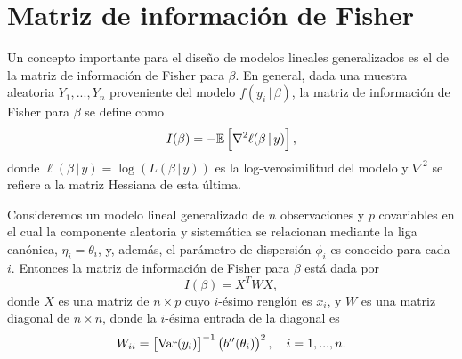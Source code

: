 \section{Matriz de información de Fisher}

Un concepto importante para el diseño de modelos lineales generalizados es el de la matriz de información de Fisher para $\beta$. En general, dada una muestra aleatoria $Y_1, ..., Y_n$ proveniente del modelo $f(y_i \, | \, \beta)$, la matriz de información de Fisher para $\beta$ se define como
\begin{equation} \label{eq:fisher_info_matrix_general}
	I(\beta) = -\mathbb{E} \left[ \nabla^2 \ell(\beta \, | \, y) \right],
\end{equation}
donde $\ell(\beta \, | \, y) = \log( L( \beta \, | \, y ) )$ es la log-verosimilitud del modelo y $\nabla^2$ se refiere a la matriz Hessiana de esta última. 

\begin{proposition}
	Consideremos un modelo lineal generalizado de $n$ observaciones y $p$ covariables en el cual la componente aleatoria y sistemática se relacionan mediante la liga canónica, $\eta_i = \theta_i$, y, además, el parámetro de dispersión $\phi_i$ es conocido para cada $i$. Entonces la matriz de información de Fisher para $\beta$ está dada por
    \begin{equation} \label{eq:fisher_info_matrix}
    	I(\beta) = X^T W X,
    \end{equation}
    donde $X$ es una matriz de $n \times p$ cuyo $i$-ésimo renglón es $x_i$, y $W$ es una matriz diagonal de $n \times n$, donde la $i$-ésima entrada de la diagonal es
\begin{equation*}
	W_{ii} = \left[ \mathrm{Var} (y_i) \right]^{-1} \left( b''(\theta_i) \right)^2, \quad i=1,...,n.
	\end{equation*}
\end{proposition}


